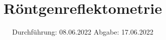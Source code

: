 

\subject{V44}
\title{Röntgenreflektometrie}
\date{%
  Durchführung: 08.06.2022
  \hspace{3em}
  Abgabe: 17.06.2022
}



\maketitle
\thispagestyle{empty}
\tableofcontents
\newpage






\printbibliography{}



